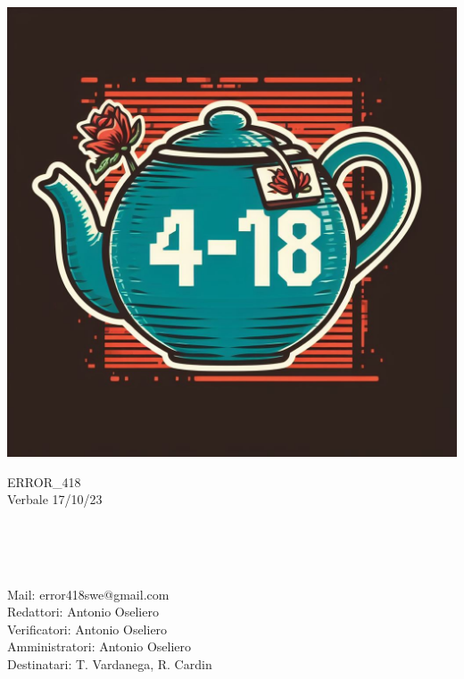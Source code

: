 \documentclass[12pt,a4paper]{article}
\begin{document}
\pagecolor{white}
\color{black}

\noindent\begin{minipage}{0.3\textwidth}

    \includegraphics[width=\linewidth]{Logo_Error-418_1.jpeg}
\end{minipage}%
\hfill%
\begin{minipage}{0.6\textwidth}\raggedright
    \huge
    ERROR\_418\\
    Verbale 17/10/23
\end{minipage}
\\
\\
\\
\raggedright \Large

Mail: \hspace{2.8cm} error418swe@gmail.com\\
\large
\vspace{4mm} Redattori:
\hspace{2cm} Antonio Oseliero\\
\vspace{4mm} Verificatori:
\hspace{1.7cm} Antonio Oseliero\\
\vspace{4mm} Amministratori:
\hspace{0.8cm} Antonio Oseliero\\
\vspace{4mm} Destinatari:
\hspace{1.7cm} T. Vardanega, R. Cardin\\
\end{document}
